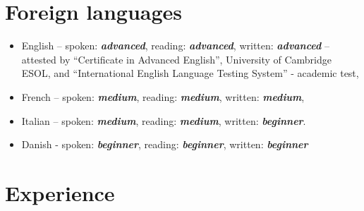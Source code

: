 \documentclass[a4paper,12pt,openany]{article}
\begin{document}
\section{Foreign languages}
		\begin{itemize}
		 	\item English – spoken: \textit{\textbf{advanced}}, reading: \textbf{\textit{advanced}}, written: \textbf{\textit{advanced}} – attested by “Certificate in Advanced English”, University of Cambridge ESOL, and “International English Language Testing System” - academic test,
			\item French – spoken: \textbf{\textit{medium}},    reading: \textbf{\textit{medium}}, written: \textbf{\textit{medium}},
			\item Italian – spoken: \textbf{\textit{medium}}, reading: \textbf{\textit{medium}}, written: \textbf{\textit{beginner}}.
			\item Danish - spoken: \textbf{\textit{beginner}}, reading: \textbf{\textit{beginner}}, written: \textbf{\textit{beginner}} 
		\end{itemize}
\newpage
\section{Experience}
\end{document}
